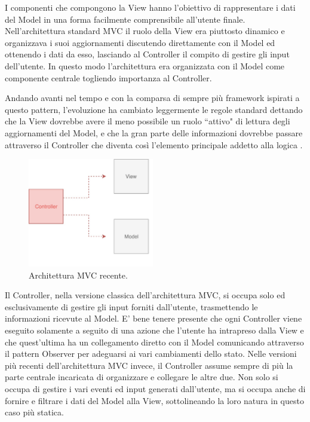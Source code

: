 I componenti che compongono la View hanno l'obiettivo di rappresentare i dati del Model in una forma facilmente comprensibile all'utente finale. Nell'architettura standard MVC il ruolo della View era piuttosto dinamico e organizzava i suoi aggiornamenti discutendo direttamente con il Model ed ottenendo i dati da esso, lasciando al Controller il compito di gestire gli input dell'utente. In questo modo l'architettura era organizzata con il Model come componente centrale togliendo importanza al Controller.

\noindent
Andando avanti nel tempo e con la comparsa di sempre più framework ispirati a questo pattern, l'evoluzione ha cambiato leggermente le regole standard dettando che la View dovrebbe avere il meno possibile un ruolo “attivo" di lettura degli aggiornamenti del Model, e che la gran parte delle informazioni dovrebbe passare attraverso il Controller che diventa così l'elemento principale addetto alla logica \cite{HopkinsOnMVCandPHP}.

\begin{figure}
\centering 
\includegraphics[width=5.5cm]{./images/MVCpassiveview}
\caption{Architettura MVC recente.}
\end{figure}

Il Controller, nella versione classica dell'architettura MVC, si occupa solo ed esclusivamente di gestire gli input forniti dall'utente, trasmettendo le informazioni ricevute al Model. E' bene tenere presente che ogni Controller viene eseguito solamente a seguito di una azione che l'utente ha intrapreso dalla View e che quest'ultima ha un collegamento diretto con il Model comunicando attraverso il pattern Observer per adeguarsi ai vari cambiamenti dello stato.
Nelle versioni più recenti dell'architettura MVC invece, il Controller assume sempre di più la parte centrale incaricata di organizzare e collegare le altre due. Non solo si occupa di gestire i vari eventi ed input generati dall'utente, ma si occupa anche di fornire e filtrare i dati del Model alla View, sottolineando la loro natura in questo caso più statica.

